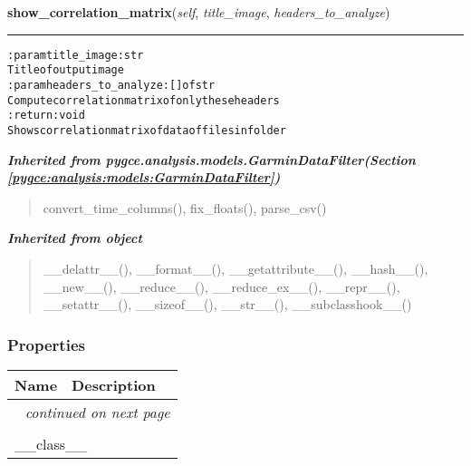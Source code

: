     \vspace{0.5ex}

\hspace{.8\funcindent}\begin{boxedminipage}{\funcwidth}

    \raggedright \textbf{show\_correlation\_matrix}(\textit{self}, \textit{title\_image}, \textit{headers\_to\_analyze})

    \vspace{-1.5ex}

    \rule{\textwidth}{0.5\fboxrule}
\setlength{\parskip}{2ex}
\begin{alltt}

:param title\_image: str
    Title of output image
:param headers\_to\_analyze: [] of str
    Compute correlation matrix of only these headers
:return: void
    Shows correlation matrix of data of files in folder
\end{alltt}

\setlength{\parskip}{1ex}
    \end{boxedminipage}


\large{\textbf{\textit{Inherited from pygce.analysis.models.GarminDataFilter\textit{(Section \ref{pygce:analysis:models:GarminDataFilter})}}}}

\begin{quote}
convert\_time\_columns(), fix\_floats(), parse\_csv()
\end{quote}

\large{\textbf{\textit{Inherited from object}}}

\begin{quote}
\_\_delattr\_\_(), \_\_format\_\_(), \_\_getattribute\_\_(), \_\_hash\_\_(), \_\_new\_\_(), \_\_reduce\_\_(), \_\_reduce\_ex\_\_(), \_\_repr\_\_(), \_\_setattr\_\_(), \_\_sizeof\_\_(), \_\_str\_\_(), \_\_subclasshook\_\_()
\end{quote}


  \subsubsection{Properties}

    \vspace{-1cm}
\hspace{\varindent}\begin{longtable}{|p{\varnamewidth}|p{\vardescrwidth}|l}
\cline{1-2}
\cline{1-2} \centering \textbf{Name} & \centering \textbf{Description}& \\
\cline{1-2}
\endhead\cline{1-2}\multicolumn{3}{r}{\small\textit{continued on next page}}\\\endfoot\cline{1-2}
\endlastfoot\multicolumn{2}{|l|}{\textit{Inherited from object}}\\
\multicolumn{2}{|p{\varwidth}|}{\raggedright \_\_class\_\_}\\
\cline{1-2}
\end{longtable}

